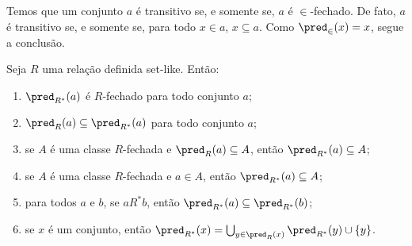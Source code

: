 \begin{example}[$\BST$]
    Temos que um conjunto $a$ é transitivo se, e somente se, $a$ é $\in$-fechado.
    De fato, $a$ é transitivo se, e somente se, para todo $x\in a$, $x\subseteq a$.
    Como $\pred_{\in}(x)=x$, segue a conclusão.
\end{example}

\begin{lemma}[$\ZFmP$]\label{lem:predRStarFechado}
    Seja $R$ uma relação definida set-like.
    Então:
    \begin{enumerate}[label=(\alph*)]
        \item $\pred_{R^*}(a)$ é $R$-fechado para todo conjunto $a$;
        \item $\pred_{R}(a)\subseteq \pred_{R^*}(a)$ para todo conjunto $a$;
        \item se $A$ é uma classe $R$-fechada e $\pred_R(a)\subseteq A$, então $\pred_{R^*}(a)\subseteq A$;
        \item se $A$ é uma classe $R$-fechada e $a\in A$, então $\pred_{R^*}(a)\subseteq A$;
        \item para todos $a$ e $b$, se $a R^* b$, então $\pred_{R^*}(a)\subseteq \pred_{R^*}(b)$;
        \item se $x$ é um conjunto, então $\pred_{R^*}(x)=\bigcup_{y \in \pred_R(x)}\pred_{R^*}(y)\cup\{y\}$.
    \end{enumerate}
\end{lemma}
